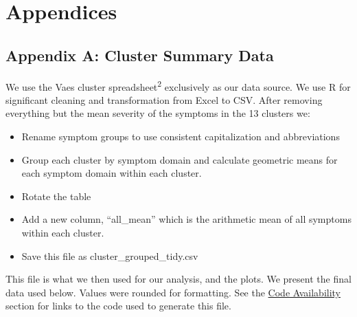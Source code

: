 \documentclass[
  letterpaper,
  DIV=11,
  numbers=noendperiod]{scrartcl}
\providecommand{\tightlist}{%
  \setlength{\itemsep}{0pt}\setlength{\parskip}{0pt}}
\begin{document}
\clearpage

\section{Appendices}\label{appendices}

\FloatBarrier

\subsection*{Appendix A: Cluster Summary Data}\label{sec-cluster-data}

We use the Vaes cluster spreadsheet\textsuperscript{2} exclusively as
our data source. We use R for significant cleaning and transformation
from Excel to CSV. After removing everything but the mean severity of
the symptoms in the 13 clusters we:

\begin{itemize}
\tightlist
\item
  Rename symptom groups to use consistent capitalization and
  abbreviations
\item
  Group each cluster by symptom domain and calculate geometric means for
  each symptom domain within each cluster.
\item
  Rotate the table
\item
  Add a new column, ``all\_mean'' which is the arithmetic mean of all
  symptoms within each cluster.
\item
  Save this file as cluster\_grouped\_tidy.csv
\end{itemize}

This file is what we then used for our analysis, and the plots. We
present the final data used below. Values were rounded for formatting.
See the \hyperref[sec-code]{Code Availability} section for links to the
code used to generate this file.
\end{document}
